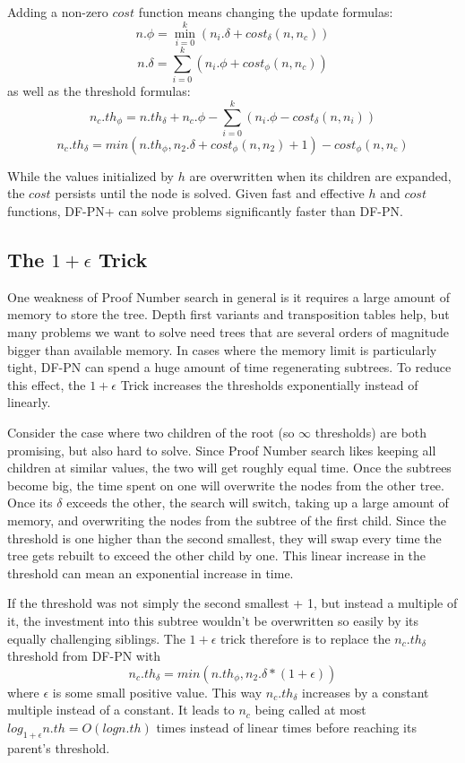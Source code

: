 Adding a non-zero $cost$ function means changing the update formulas: $$ n.\phi = \displaystyle\min\limits_{i=0}^k (n_i.\delta + cost_\delta(n, n_c))$$ $$n.\delta = \displaystyle\sum\limits_{i=0}^k (n_i.\phi + cost_\phi(n, n_c))$$ as well as the threshold formulas:
$$n_c.th_\phi = n.th_\delta + n_c.\phi - \displaystyle\sum\limits_{i=0}^k (n_i.\phi - cost_\delta(n, n_i))$$ $$n_c.th_\delta = min(n.th_\phi, n_2.\delta + cost_\phi(n, n_2) + 1) - cost_\phi(n, n_c)$$

While the values initialized by $h$ are overwritten when its children are expanded, the $cost$ persists until the node is solved. Given fast and effective $h$ and $cost$ functions, DF-PN+ can solve problems significantly faster than DF-PN.

\subsection{The $1+\epsilon$ Trick} \label{sec:epstrick}

One weakness of Proof Number search in general is it requires a large amount of memory to store the tree. Depth first variants and transposition tables help, but many problems we want to solve need trees that are several orders of magnitude bigger than available memory. In cases where the memory limit is particularly tight, DF-PN can spend a huge amount of time regenerating subtrees. To reduce this effect, the $1+\epsilon$ Trick \cite{pawlewicz2007epsilon} increases the thresholds exponentially instead of linearly.

Consider the case where two children of the root (so $\infty$ thresholds) are both promising, but also hard to solve. Since Proof Number search likes keeping all children at similar values, the two will get roughly equal time. Once the subtrees become big, the time spent on one will overwrite the nodes from the other tree. Once its $\delta$ exceeds the other, the search will switch, taking up a large amount of memory, and overwriting the nodes from the subtree of the first child. Since the threshold is one higher than the second smallest, they will swap every time the tree gets rebuilt to exceed the other child by one. This linear increase in the threshold can mean an exponential increase in time.

If the threshold was not simply the second smallest + 1, but instead a multiple of it, the investment into this subtree wouldn't be overwritten so easily by its equally challenging siblings. The $1 + \epsilon$ trick therefore is to replace the $n_c.th_\delta$ threshold from DF-PN with $$n_c.th_\delta = min(n.th_\phi, n_2.\delta*(1 + \epsilon))$$ where $\epsilon$ is some small positive value. This way $n_c.th_\delta$ increases by a constant multiple instead of a constant. It leads to $n_c$ being called at most $log_{1+\epsilon}n.th = O(log n.th)$ times instead of linear times before reaching its parent's threshold.

